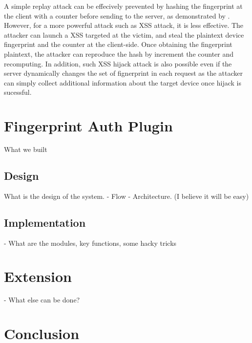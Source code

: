 \documentclass{acm_proc_article-sp}
\begin{document}
A simple replay attack can be effecively prevented by hashing the fingerprint at the client with a counter before sending to the server, as demonstrated by \cite{preu:smart}. However, for a more powerful attack such as XSS attack, it is less effective. The attacker can launch a XSS targeted at the victim, and steal the plaintext device fingerprint and the counter at the client-side. Once obtaining the fingerprint plaintext, the attacker can reproduce the hash by increment the counter
and recomputing. In addition, such XSS hijack attack is also possible even if the server dynamically changes the set of fignerprint in each request \cite{unger:shpf} as the attacker can simply collect additional information about the target device once hijack is sucessful.



\section{Fingerprint Auth Plugin}
What we built
\subsection{Design}
What is the design of the system. 
- Flow
- Architecture. (I believe it will be easy)

\subsection{Implementation}
- What are the modules, key functions, some hacky tricks


\section{Extension}
- What else can be done?


\section{Conclusion}



\end{document}
